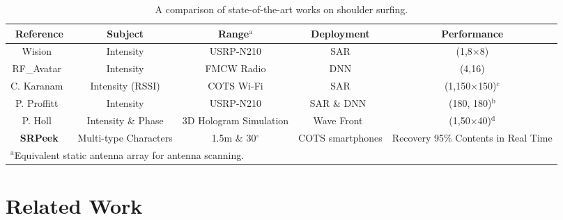 \begin{table*}[t]
    \caption{A comparison of state-of-the-art works on shoulder surfing.}
    \vspace{2mm}
    \begin{center}
    \begin{tabular}{ccccc}
    \hline
     Reference & Subject & Range$^{\mathrm{a}}$ & Deployment & Performance\\ 
    \hline
    Wision~\cite{wision}  & Intensity & USRP-N210 & SAR & (1,8$\times$8)\\ 
    RF\_Avatar~\cite{rf_avatar}  & Intensity & FMCW Radio & DNN & (4,16)\\ 
    C. Karanam~\cite{3dimaging_uav} & Intensity (RSSI) & COTS Wi-Fi & SAR & (1,150$\times$150)$^{\mathrm{c}}$\\ 
    P. Proffitt~\cite{imaging_1} & Intensity & USRP-N210 & SAR \& DNN~\cite{MaskRCNN} & (180, 180)$^{\mathrm{b}}$\\ 
    P. Holl~\cite{holography} & Intensity \& Phase & 3D Hologram Simulation & Wave Front~\cite{angular} & (1,50$\times$40)$^{\mathrm{d}}$\\ 
    \hline
    \textbf{\textsf{SRPeek}} & Multi-type Characters & 1.5m \& 30$^\circ$ & COTS smartphones & Recovery 95\% Contents in Real Time \\
    \hline
    \multicolumn{5}{l}{$^{\mathrm{a}}$Equivalent static antenna array for antenna scanning.}\\
    \end{tabular}
    \label{comparison}
    \end{center}
\end{table*}

\section{Related Work}
\label{sec-related-work}

